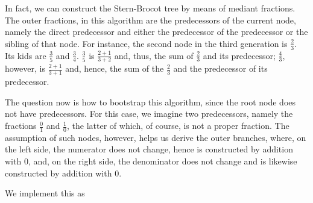 \documentclass[tikz]{scrreprt}
\begin{document}
In fact, we can construct the Stern-Brocot tree
by means of mediant fractions. The outer fractions,
in this algorithm are the predecessors of the current node,
namely the direct predecessor and either the predecessor
of the predecessor or the sibling of that node.
For instance, the second node in the third generation
is $\frac{2}{3}$. Its kids are 
$\frac{3}{5}$ and $\frac{3}{4}$.
$\frac{3}{5}$ is $\frac{2+1}{3+2}$ and, thus,
the sum of $\frac{2}{3}$ and its predecessor;
$\frac{4}{3}$, however, is $\frac{2+1}{3+1}$
and, hence, the sum of the $\frac{2}{3}$ 
and the predecessor of its predecessor.

The question now is how to bootstrap this algorithm,
since the root node does not have predecessors.
For this case, we imagine two predecessors, namely
the fractions $\frac{0}{1}$ and $\frac{1}{0}$,
the latter of which, of course, is not a proper fraction.
The assumption of such nodes, however, helps us derive
the outer branches, where, on the left side, the numerator
does not change, hence is constructed by addition with 0, and,
on the right side, the denominator does not change and is
likewise constructed by addition with 0.

We implement this as
\end{document}
